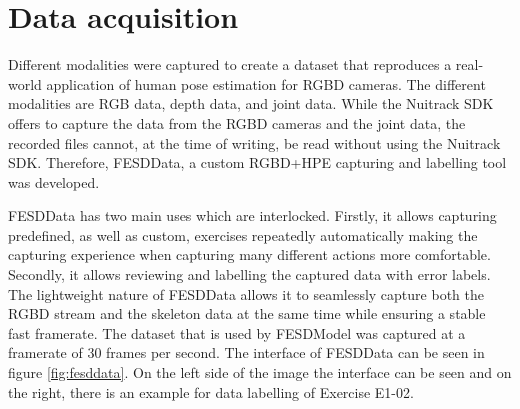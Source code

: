 \section{Data acquisition}
\label{sec:data_acquisition}

Different modalities were captured to create a dataset that reproduces a real-world application of human pose estimation for RGBD cameras. The different modalities are RGB data, depth data, and joint data. While the Nuitrack SDK offers to capture the data from the RGBD cameras and the joint data, the recorded files cannot, at the time of writing, be read without using the Nuitrack SDK. Therefore, FESDData, a custom RGBD+HPE capturing and labelling tool was developed. 

FESDData has two main uses which are interlocked. Firstly, it allows capturing predefined, as well as custom, exercises repeatedly automatically making the capturing experience when capturing many different actions more comfortable. Secondly, it allows reviewing and labelling the captured data with error labels. The lightweight nature of FESDData allows it to seamlessly capture both the RGBD stream and the skeleton data at the same time while ensuring a stable fast framerate. The dataset that is used by FESDModel was captured at a framerate of 30 frames per second. The interface of FESDData can be seen in figure \ref{fig:fesddata}. On the left side of the image the interface can be seen and on the right, there is an example for data labelling of Exercise E1-02.


